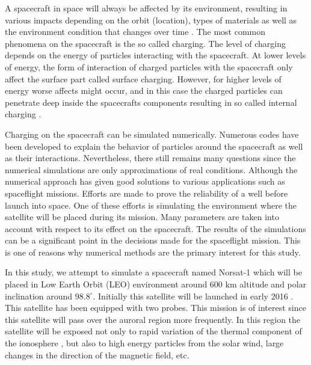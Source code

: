 

A spacecraft in space will always be affected by its environment, resulting in various
impacts depending on the orbit (location), types of materials as well as the environment
condition that changes over time \citep{trove.nla.gov.au/work/21680840}. The  most common phenomena on the spacecraft is the so
called charging. The level of charging depends on the energy of particles interacting with
the spacecraft. At lower levels of energy, the form of interaction of charged particles with the
spacecraft only affect the surface part called surface charging. However, for higher levels of energy
worse affects might occur, and in this case the charged particles
can penetrate deep inside the spacecrafts components resulting in so called internal charging \citep{fennell2001spacecraft}.

Charging on the spacecraft can be simulated numerically. Numerous codes have been developed
to explain the behavior of particles around the spacecraft as well as their interactions.
Nevertheless, there still remains many questions since the numerical simulations are only approximations
of real conditions. Although the numerical approach has given good solutions to various applications
such as spaceflight missions. Efforts are made to prove the reliability of a well before launch into space.
One of these efforts is simulating the environment where the satellite will be placed during its mission.
Many parameters are taken into account with respect to its effect on the spacecraft.
The results of the simulations can be a significant point in the decisions made for the spaceflight
mission. This is one of reasons why numerical methods are the primary interest for this study.

In this study, we attempt to simulate a spacecraft named Norsat-1 which will be placed in
Low Earth Orbit (LEO) environment around 600 km altitude and polar inclination around \(98.8^\circ\).
Initially this satellite will be launched in early 2016
\citep{norSat}. This satellite
has been equipped with two probes. This mission is of interest since this satellite will pass over
the auroral region more frequently. In this region the satellite will be exposed not only to
rapid variation of the thermal component of the ionosphere \citep{hastings1995review}, but also to high
energy particles from the solar wind, large changes in the direction of the magnetic field, etc.


